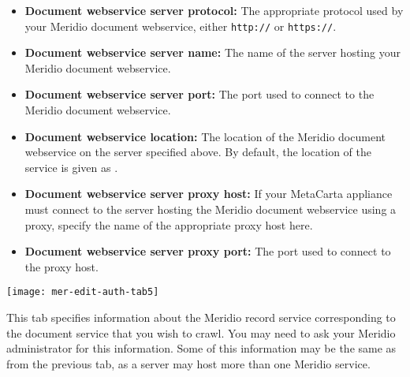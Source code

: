 \begin{itemize}

\item \textbf{Document webservice server protocol:} The appropriate protocol used by your Meridio document webservice, either \texttt{http://} or \texttt{https://}.

\item \textbf{Document webservice server name:} The name of the server hosting your Meridio document webservice.

\item \textbf{Document webservice server port:} The port used to connect to the Meridio document webservice.

\item \textbf{Document webservice location:} The location of the Meridio document webservice on the server specified above. By default, the location of the service is given as .

\item \textbf{Document webservice server proxy host:} If your MetaCarta appliance must connect to the server hosting the Meridio document webservice using a proxy, specify the name of the appropriate proxy host here.

\item \textbf{Document webservice server proxy port:} The port used to connect to the proxy host.

\end{itemize}

\texttt{[image: mer-edit-auth-tab5]}


This tab specifies information about the Meridio record service
corresponding to the document service that you wish to crawl. You may
need to ask your Meridio administrator for this information. Some of
this information may be the same as from the previous tab, as a server
may host more than one Meridio service.


